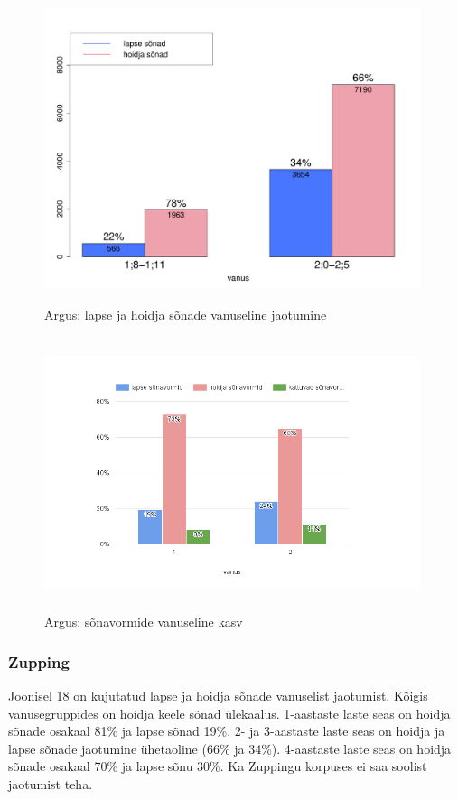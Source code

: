 \documentclass[12pt]{article}
\begin{document}
\begin{figure}[H]
    \centering
    \includegraphics[width=11cm, height=9cm]{argus_vanus_sonad}
    \caption{Argus: lapse ja hoidja sõnade vanuseline jaotumine}
\end{figure}


\begin{figure}[H]
    \centering
    \includegraphics[width=11cm, height=8cm]{argus_vanus_vormid}
    \caption{Argus: sõnavormide vanuseline kasv}
\end{figure}



\subsubsection{Zupping}

Joonisel 18 on kujutatud lapse ja hoidja sõnade vanuselist jaotumist. Kõigis vanusegruppides on hoidja keele sõnad ülekaalus. 1-aastaste laste seas on hoidja sõnade osakaal 81\% ja lapse sõnad 19\%. 2- ja 3-aastaste laste seas on hoidja ja lapse sõnade jaotumine ühetaoline (66\% ja 34\%). 4-aastaste laste seas on hoidja sõnade osakaal 70\% ja lapse sõnu 30\%. Ka Zuppingu korpuses ei saa soolist jaotumist teha.
\end{document}
